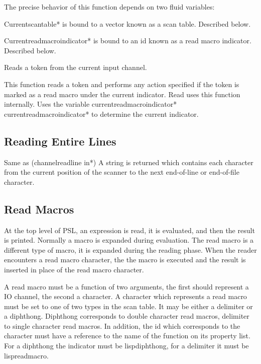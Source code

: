 The precise behavior of this function depends on two fluid
variables:

    Currentscantable* is bound to  a  vector  known  as  a  scan
                  table.  Described below. 

    Currentreadmacroindicator* is bound to an id known as a read
                  macro indicator.  Described below.

{    Reads a token from the current input channel.  }

{    This   function  reads  a  token  and  performs  any  action
    specified if the token is marked as a read macro  under  the
    current  indicator.   Read  uses  this  function internally.
    Uses the variable  currentreadmacroindicator*
    {\index currentreadmacroindicator*} to  determine
    the current indicator.
}

\subsection{Reading Entire Lines}

{ Same as (channelreadline in*)}
{    A  string is returned which contains each character from the
    current position of the scanner to the next  end-of-line  or
    end-of-file character.
}

\subsection{Read Macros}

  At  the  top  level  of  PSL,  an  expression  is  read, it is
evaluated, and then the result is printed.  Normally a macro  is
expanded  during evaluation.  The read macro is a different type
of macro, it is expanded during the reading  phase.    When  the
reader  encounters  a  read  macro  character,  the the macro is
executed and the result is inserted in place of the  read  macro
character.

  A  read  macro  must be a function of two arguments, the first
should represent a IO  channel,  the  second  a  character.    A
character  which  represents  a read macro must be set to one of
two types in the scan table.  It may be either a delimiter or  a
diphthong.    Diphthong  corresponds  to  double  character read
macros, delimiter to single character read macros.  In addition,
the id which corresponds to the  character must have a reference
to the name of the  function  on  its  property  list.    For  a
diphthong  the  indicator must be lispdiphthong, for a delimiter
it must be lispreadmacro.

